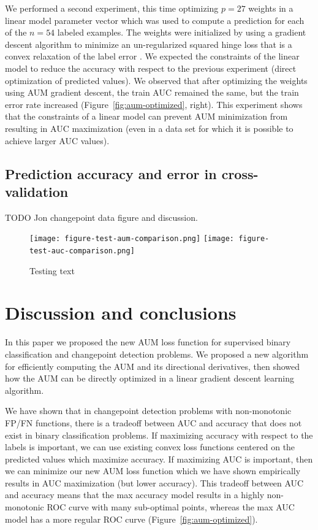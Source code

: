 \documentclass{article}
\begin{document}
We performed a second experiment, this time optimizing  $p=27$ weights in a linear model parameter vector which was used to compute a prediction for each of the $n=54$ labeled examples.
The weights were initialized by using a gradient descent algorithm to minimize an un-regularized squared hinge loss that is a convex relaxation of the label error \citep{Hocking2013icml}.
We expected the constraints of the linear model to reduce the accuracy with respect to the previous experiment (direct optimization of predicted values).
We observed that after optimizing the weights using AUM gradient descent, the train AUC remained the same, but the train error rate increased (Figure~\ref{fig:aum-optimized}, right).
This experiment shows that the constraints of a linear model can prevent AUM minimization from resulting in AUC maximization (even in a data set for which it is possible to achieve larger AUC values).

\subsection{Prediction accuracy and error in cross-validation}

TODO Jon changepoint data figure and discussion.




\begin{figure}[ht]
\vskip 0.2in
\begin{center}
\texttt{[image: figure-test-aum-comparison.png]}
\texttt{[image: figure-test-auc-comparison.png]}
\vskip -0.5cm
\caption{Testing text}
\label{fig:test-aum-comparison}
\end{center}
\vskip -0.2in
\end{figure}
\section{Discussion and conclusions}
\label{sec:discussion}

In this paper we proposed the new AUM loss function for supervised binary classification and changepoint detection problems.
We proposed a new algorithm for efficiently computing the AUM and its directional derivatives, then showed how the AUM can be directly optimized in a linear gradient descent learning algorithm. 

We have shown that in changepoint detection problems with non-monotonic FP/FN functions, there is a tradeoff between AUC and accuracy that does not exist in binary classification problems.
If maximizing accuracy with respect to the labels is important, we can use existing convex loss functions centered on the predicted values which maximize accuracy.
If maximizing AUC is important, then we can minimize our new AUM loss function which we have shown empirically results in AUC maximization (but lower accuracy).
This tradeoff between AUC and accuracy means that the max accuracy model results in a highly non-monotonic ROC curve with many sub-optimal points, whereas the max AUC model has a more regular ROC curve (Figure~\ref{fig:aum-optimized}).
\end{document}

